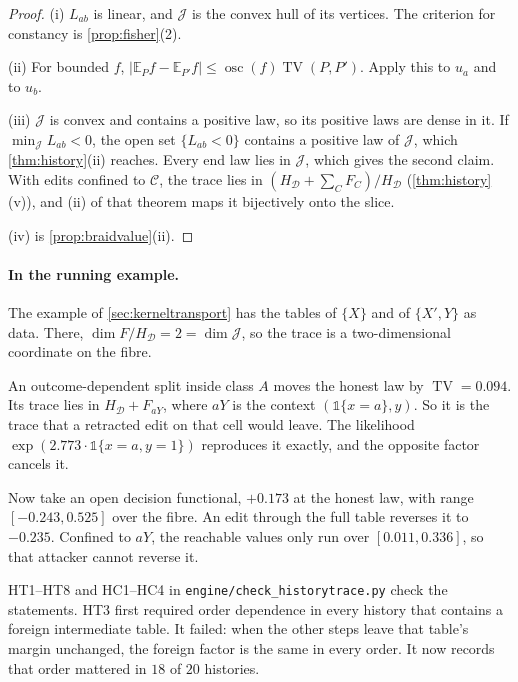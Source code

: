 \documentclass[11pt]{article}
\theoremstyle{definition}\newtheorem{definition}[theorem]{Definition}\newtheorem{remark}[theorem]{Remark}\newtheorem{example}[theorem]{Example}\newtheorem{problem}[theorem]{Open problem}\crefname{problem}{Problem}{Problems}
\begin{document}
\begin{proof}
(i) $L_{ab}$ is linear, and $\mathcal J$ is the convex hull of its vertices. The criterion for constancy is \cref{prop:fisher}(2).

(ii) For bounded $f$, $|\mathbb E_Pf-\mathbb E_{P'}f|\le\operatorname{osc}(f)\operatorname{TV}(P,P')$. Apply this to $u_a$ and to $u_b$.

(iii) $\mathcal J$ is convex and contains a positive law, so its positive laws are dense in it. If $\min_{\mathcal J}L_{ab}<0$, the open set $\{L_{ab}<0\}$ contains a positive law of $\mathcal J$, which \cref{thm:history}(ii) reaches. Every end law lies in $\mathcal J$, which gives the second claim. With edits confined to $\mathcal C$, the trace lies in $(H_{\mathcal D}+\sum_CF_C)/H_{\mathcal D}$ (\cref{thm:history}(v)), and (ii) of that theorem maps it bijectively onto the slice.

(iv) is \cref{prop:braidvalue}(ii).
\end{proof}

\paragraph{In the running example.} The example of \cref{sec:kerneltransport} has the tables of $\{X\}$ and of $\{X',Y\}$ as data. There, $\dim F/H_{\mathcal D}=2=\dim\mathcal J$, so the trace is a two-dimensional coordinate on the fibre.

An outcome-dependent split inside class $A$ moves the honest law by $\operatorname{TV}=0.094$. Its trace lies in $H_{\mathcal D}+F_{aY}$, where $aY$ is the context $(\mathbb 1\{x=a\},y)$. So it is the trace that a retracted edit on that cell would leave. The likelihood $\exp(2.773\cdot\mathbb 1\{x=a,y=1\})$ reproduces it exactly, and the opposite factor cancels it.

Now take an open decision functional, $+0.173$ at the honest law, with range $[-0.243,0.525]$ over the fibre. An edit through the full table reverses it to $-0.235$. Confined to $aY$, the reachable values only run over $[0.011,0.336]$, so that attacker cannot reverse it.

HT1--HT8 and HC1--HC4 in \texttt{engine/check\_historytrace.py} check the statements. HT3 first required order dependence in every history that contains a foreign intermediate table. It failed: when the other steps leave that table's margin unchanged, the foreign factor is the same in every order. It now records that order mattered in $18$ of $20$ histories.
\end{document}
